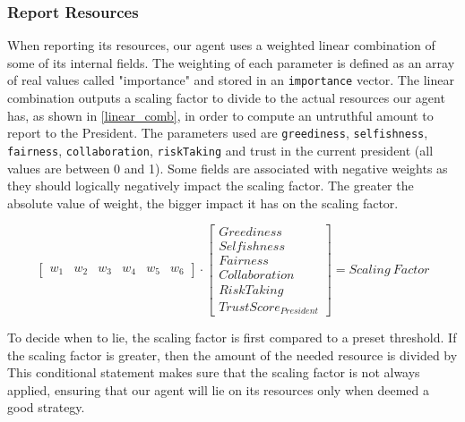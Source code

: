 \subsubsection{Report Resources} \label{reportresources}
When reporting its resources, our agent uses a weighted linear combination of some of its internal fields. The weighting of each parameter is defined as an array of real values called "importance" and stored in an \texttt{importance} vector. The linear combination outputs a scaling factor to divide to the actual resources our agent has, as shown in \eqref{linear_comb}, in order to compute an untruthful amount to report to the President. The parameters used are \texttt{greediness}, \texttt{selfishness}, \texttt{fairness}, \texttt{collaboration}, \texttt{riskTaking} and trust in the current president (all values are between 0 and 1). Some fields are associated with negative weights as they should logically negatively impact the scaling factor. The greater the absolute value of weight, the bigger impact it has on the scaling factor.

\begin{equation}\label{linear_comb}
    \begin{bmatrix}
        w_{1}& w_{2}& w_{3}& w_{4}& w_{5}& w_{6}
    \end{bmatrix}
    \cdot
    \begin{bmatrix}
    Greediness \\ 
    Selfishness \\ 
    Fairness \\ 
    Collaboration \\ 
    RiskTaking \\
    TrustScore_{President}
    \end{bmatrix}
    = Scaling\:Factor
\end{equation}

To decide when to lie, the scaling factor is first compared to a preset threshold. If the scaling factor is greater, then the amount of the needed resource is divided by 
\begin{equation}
    [1 + (Scaling\:Factor - Preset\:Threshold)]
\end{equation} 
This conditional statement makes sure that the scaling factor is not always applied, ensuring that our agent will lie on its resources only when deemed a good strategy.

